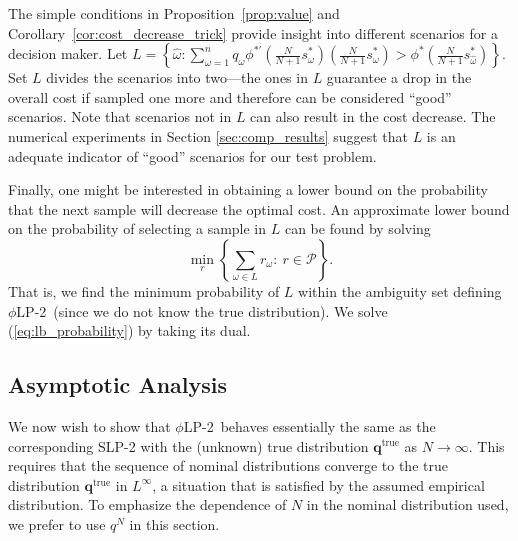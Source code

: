 \documentclass[opre,nonblindrev]{informs3} %
\newcommand{\q}{\mathbf{q}}
\newcommand{\qtrue}{\q^{\text{true}}}
\newcommand{\plp}{$\phi$LP-2}
\begin{document}
The simple conditions in Proposition~\ref{prop:value} and Corollary~\ref{cor:cost_decrease_trick} provide insight into different scenarios for a decision maker. 
Let $L = \left\{ \hat{\omega} : \sum_{\omega=1}^n q_\omega \phi^{*\prime}\left(\frac{N}{N+1}s^*_\omega\right) \left(\frac{N}{N+1}s^*_\omega\right) > \phi^*\left(\frac{N}{N+1}s^*_{\hat{\omega}}\right) \right\}$.
Set $L$ divides the scenarios into two---the ones in $L$ guarantee a drop in the overall cost if sampled one more and therefore can be considered ``good'' scenarios. 
Note that scenarios not in $L$ can also result in the cost decrease. 
The numerical experiments in Section \ref{sec:comp_results} suggest that $L$ is an adequate indicator of ``good'' scenarios for our test problem. 
 

Finally, one might be interested in obtaining a lower bound on the probability that the next sample will decrease the optimal cost. 
An approximate lower bound on the probability of selecting a sample in $L$ can be found by solving
\begin{equation}
	\min_{r} \left\{ \sum_{\omega \in L} r_\omega \colon\ r \in \mathcal{P} \right\}. \label{eq:lb_probability}
\end{equation}
That is, we find the minimum probability of $L$ within the ambiguity set defining \plp\ (since we do not know the true distribution).
We solve (\ref{eq:lb_probability}) by taking its dual.


\subsection{Asymptotic Analysis}
\label{ssec:epiconvergence}

We now wish to show that \plp\ behaves essentially the same as the corresponding SLP-2 with the (unknown) true distribution $\qtrue$ as $N\rightarrow \infty$. 
This requires that the sequence of nominal distributions converge to the true distribution $\qtrue$ in $L^\infty$, a situation that is satisfied by the assumed empirical distribution.
To emphasize the dependence of $N$ in the nominal distribution used, we prefer to use $q^N$ in this section. 
\end{document}
